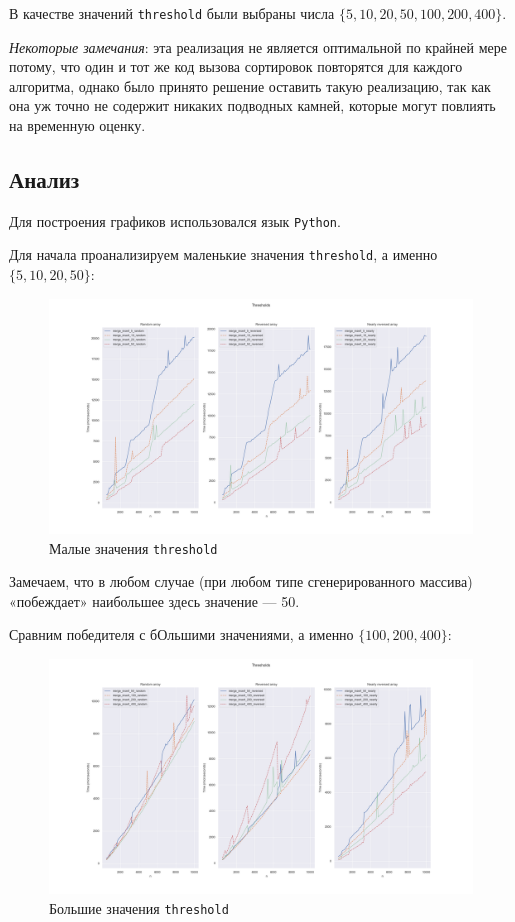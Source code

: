 \documentclass[11pt,a4paper]{scrarticle}
\theoremstyle{definition}
\begin{document}
В качестве значений \texttt{threshold} были выбраны числа $\{5, 10, 20, 50, 100, 200, 400\}$.

\emph{Некоторые замечания}: эта реализация не является оптимальной по крайней мере потому, что один и тот же код вызова сортировок повторятся для каждого алгоритма, однако было принято решение оставить такую реализацию, так как она уж точно не содержит никаких подводных камней, которые могут повлиять на временную оценку.

\subsection*{Анализ}

Для построения графиков использовался язык \texttt{Python}.

Для начала проанализируем маленькие значения \texttt{threshold}, а именно $\{5, 10, 20, 50\}$:

\begin{figure}[htp]
	\centering
	\includegraphics[width=\textwidth]{../static/thresholds_analysis_small_values.png}
	\caption{Малые значения \texttt{threshold}}
	\label{fig:thresholds-small}
\end{figure}
\FloatBarrier

Замечаем, что в любом случае (при любом типе сгенерированного массива) «побеждает» наибольшее здесь значение --- 50.

Сравним победителя с бОльшими значениями, а именно $\{100, 200, 400\}$:

\begin{figure}[htp]
	\centering
	\includegraphics[width=\textwidth]{../static/thresholds_analysis_big_values.png}
	\caption{Большие значения \texttt{threshold}}
	\label{fig:thresholds-big}
\end{figure}
\FloatBarrier
\end{document}
